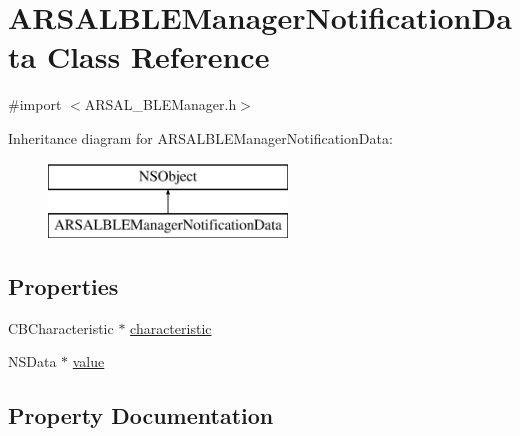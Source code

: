 \hypertarget{interfaceARSALBLEManagerNotificationData}{}\section{A\+R\+S\+A\+L\+B\+L\+E\+Manager\+Notification\+Data Class Reference}
\label{interfaceARSALBLEManagerNotificationData}


{\ttfamily \#import $<$A\+R\+S\+A\+L\+\_\+\+B\+L\+E\+Manager.\+h$>$}

Inheritance diagram for A\+R\+S\+A\+L\+B\+L\+E\+Manager\+Notification\+Data\+:\begin{figure}[H]
\begin{center}
\leavevmode
\includegraphics[height=2.000000cm]{interfaceARSALBLEManagerNotificationData}
\end{center}
\end{figure}
\subsection*{Properties}
\begin{DoxyCompactItemize}
\item 
C\+B\+Characteristic $\ast$ \hyperlink{interfaceARSALBLEManagerNotificationData_a2a13532ac913be87b8e8c708859d96ea}{characteristic}
\item 
N\+S\+Data $\ast$ \hyperlink{interfaceARSALBLEManagerNotificationData_ad946383fc336fd155e1a1a087ee230f4}{value}
\end{DoxyCompactItemize}


\subsection{Property Documentation}
\hypertarget{interfaceARSALBLEManagerNotificationData_a2a13532ac913be87b8e8c708859d96ea}{}\label{interfaceARSALBLEManagerNotificationData_a2a13532ac913be87b8e8c708859d96ea} 

